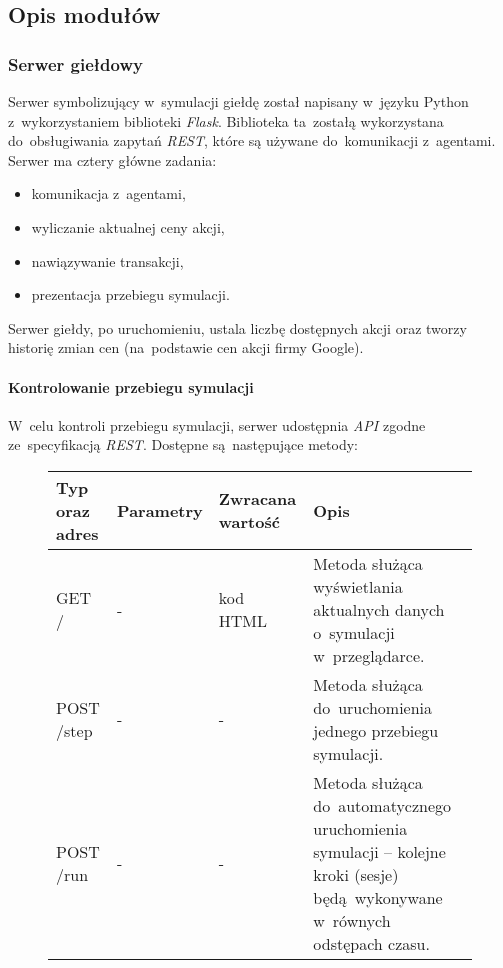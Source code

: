 \documentclass[11pt,a4paper]{article}
\begin{document}
\subsection{Opis modułów}
\subsubsection{Serwer giełdowy}
Serwer symbolizujący w~symulacji giełdę został napisany w~języku Python z~wykorzystaniem
biblioteki \textit{Flask}. Biblioteka ta~zostałą wykorzystana do~obsługiwania zapytań \textit{REST}, które
są używane do~komunikacji z~agentami. Serwer ma cztery główne zadania:
\begin{multicols}{2}
  \begin{itemize}
    \item komunikacja z~agentami,
    \item wyliczanie aktualnej ceny akcji,
    \item nawiązywanie transakcji,
    \item prezentacja przebiegu symulacji.
  \end{itemize}
\end{multicols}

Serwer giełdy, po uruchomieniu, ustala liczbę dostępnych akcji oraz tworzy historię zmian cen (na~podstawie cen akcji firmy Google).

\paragraph{Kontrolowanie przebiegu symulacji}
W~celu kontroli przebiegu symulacji, serwer udostępnia \textit{API} zgodne ze~specyfikacją \textit{REST}. Dostępne są~następujące metody:
\begin{figure}[H]
  \begin{tabularx}{\textwidth}{ |p{2.5cm}|p{3.4cm}|p{3cm}|X| }
    \hline \textbf{Typ oraz \newline adres} & \textbf{Parametry} & \textbf{Zwracana \newline wartość} & \textbf{Opis} \\ \hline
    GET \newline / & - & kod HTML & Metoda służąca wyświetlania aktualnych danych o~symulacji w~przeglądarce. \\ \hline
    POST \newline /step & - & - & Metoda służąca do~uruchomienia jednego przebiegu symulacji. \\ \hline
    POST \newline /run & - & - & Metoda służąca do~automatycznego uruchomienia symulacji -- kolejne kroki (sesje) będą wykonywane w~równych odstępach czasu. \\ \hline
  \end{tabularx}
\end{figure}
\end{document}

